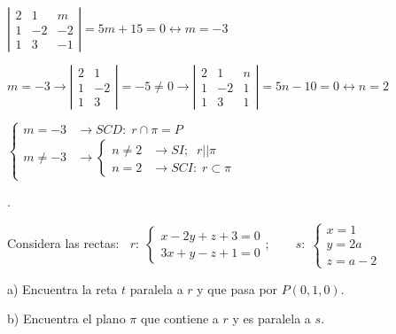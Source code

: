 \begin{proofw}
\noindent $\left|\begin{matrix} 2&1&m\\1&-2&-2\\1&3&-1 \end{matrix}\right|=5m+15=0 \leftrightarrow m=-3$

\noindent $m=-3 \to \left|\begin{matrix} 2&1\\1&-2\\1&3 \end{matrix}\right|=-5\neq 0 \to  \left|\begin{matrix} 2&1&n\\1&-2&1\\1&3&1  \end{matrix} \right|=5n-10=0 \leftrightarrow n=2$

\noindent $\begin{cases} 
m=-3 &\to SCD:\; r\cap \pi=P \\
m\neq -3 &\to 
\begin{cases} n\neq 2 &\to SI;\;\; r||\pi   \\ n=2 &\to SCI:\; r\subset \pi \end{cases}	
\end{cases}$

\end{proofw}



\begin{ejre}.
	
	Considera las rectas:
	$\;\;r:\; \begin{cases} x-2y+z+3=0\\3x+y-z+1=0 \end{cases} ; \qquad  s:\; \begin{cases} x=1\\y=2a\\z=a-2 \end{cases}  $
	
	a) Encuentra la reta $t$ paralela a $r$ y que pasa por $P(0,1,0)$.
	
	b) Encuentra el plano $\pi$ que contiene a $r$ y es paralela a $s$.
\end{ejre}

